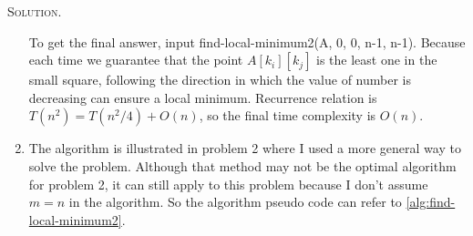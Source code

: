 \documentclass[12pt, a4paper, oneside]{ctexart}
\newenvironment{solution}{\par\noindent\textsc{Solution. }}{\\\par}
\begin{document}
\begin{solution}
\begin{enumerate}
\begin{algorithm}[H]
\begin{algorithmic}[1]
            \end{algorithmic}
        \end{algorithm}
                

        
        To get the final answer, input find-local-minimum2(A, 0, 0, n-1, n-1). Because each time we guarantee that the point $A[k_i][k_j]$ is the least one in the small square, following the direction in which the value of number is decreasing can ensure a local minimum. Recurrence relation is $T(n^2) = T(n^2/4) + O(n)$, so the final time complexity is $O(n)$.
        
        \item The algorithm is illustrated in problem 2 where I used a more general way to solve the problem. Although that method may not be the optimal algorithm for problem 2, it can still apply to this problem because I don't assume $m = n$ in the algorithm. So the algorithm pseudo code can refer to \ref{alg:find-local-minimum2}.
        

\end{enumerate}
\end{solution}
\end{document}
